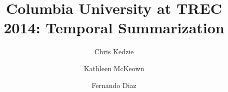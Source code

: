 \documentclass[10pt]{article} \usepackage{url} \usepackage{color}
\begin{document}
%

\title{Columbia University at TREC 2014: Temporal Summarization}

\author[1]{Chris Kedzie}
\author[1]{Kathleen McKeown}
\author[2]{Fernando Diaz}
%
%
%
%
%

%
%
%
\end{document}
